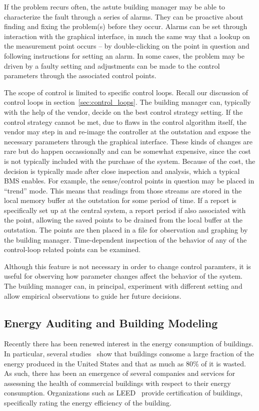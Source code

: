 If the problem recurs often, the astute building manager may be able to characterize the fault through a series of alarms.
They can be proactive about finding and fixing the problem(s) before they occur.  Alarms can be set through interaction
with the graphical interface, in much the same way that a lookup on the measurement point occurs -- by double-clicking on 
the point in question and following instructions for setting an alarm.  In some cases, the problem may be driven 
by a faulty setting and adjustments can be made to the control parameters through the associated control points.

The scope of control is limited to specific control loops.  Recall our discussion of control loops in section~\ref{sec:control_loops}.
The building manager can, typically with the help of the vendor, decide on the best control strategy setting.  If the control
strategy cannot be met, due to flaws in the control algorithm itself, the vendor may step in and re-image the controller
at the outstation and expose the necessary parameters through the graphical interface.  These kinds of changes are rare
but do happen occassionally and can be somewhat expensive, since the cost is not typically included with the purchase
of the system.  Because of the cost, the decision is typically made after close inspection and analysis, which a typical BMS
enables.  For example, the sense/control points in question may be placed in ``trend'' mode.  This means that readings
from those streams are stored in the local memory buffer at the outstation for some period of time.  If a report is specifically
set up at the central system, a report period if also associated with the point, allowing the saved points to be drained
from the local buffer at the outstation.  The points are then placed in a file for observation and graphing by the 
building manager.  Time-dependent inspection of the behavior of any of the control-loop related points can be examined.

Although this feature is not necessary in order to change control paramters, it is useful for observing how parameter changes
affect the behavior of the system.  The building manager can, in principal, experiment with different setting and allow
empirical observations to guide her future decisions.


\subsection{Energy Auditing and Building Modeling}
Recently there has been renewed interest in the energy consumption of buildings.  In particular, several studies~\cite{BuildingEnergyData,
MITBuildingScience} show that buildings consome a large fraction of the energy produced in the United States and that as much
as 80\% of it is wasted.  As such, there has been an emergence of several companies and services for assessning the health of
commercial buildings with respect to their energy consumption.  Organizations such as LEED~\cite{Leed} provide certification of 
buildings, specifically rating the energy efficiency of the building.

